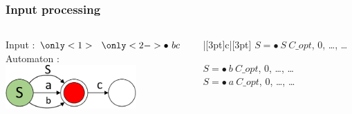 \documentclass{beamer}
\newcounter{NoTableEntry}
\renewcommand*{\theNoTableEntry}{NTE-\the\value{NoTableEntry}}
\newcommand*{\strike}[2]{%
	\multicolumn{1}{#1}{%
		\stepcounter{NoTableEntry}%
		\vadjust pre{\zsavepos{\theNoTableEntry t}}%
		\vadjust{\zsavepos{\theNoTableEntry b}}%
		\zsavepos{\theNoTableEntry l}%
		\hspace{0pt plus 1filll}%
		#2%
		\hspace{0pt plus 1filll}%
		\zsavepos{\theNoTableEntry r}%
		\tikz[overlay]{%
			\draw
			let
			\n{llx}={\zposx{\theNoTableEntry l}sp-\zposx{\theNoTableEntry r}sp-\tabcolsep},
			\n{urx}={\tabcolsep},
			\n{lly}={\zposy{\theNoTableEntry b}sp-\zposy{\theNoTableEntry r}sp},
			\n{ury}={\zposy{\theNoTableEntry t}sp-\zposy{\theNoTableEntry r}sp}
			in
			(\n{llx}, \n{lly}) -- (\n{urx}, \n{ury})
			;
		}%
	}%
}
\begin{document}
	\begin{frame} 
		\frametitle{Input processing}
		\begin{columns}
			\begin{column}{5cm}
				Input : $\only<1>{\ \ }\only<2->{\bullet} \ b c $ \\
				\vspace{15pt}
				Automaton : \\
				\vspace{5pt}
				\includegraphics[width=5cm]{pictures/G2.pdf}
			\end{column}
			\begin{column}{5cm}
				\begin{tabu}{|[3pt]c|[3pt]}
					$S =\bullet \ S\ C\_opt$, 0, \dots, \dots \\
					\hline
					
					$S =\bullet \ b\ C\_opt$, 0, \dots, \dots \\
					\hline
					$S =\bullet \ a\ C\_opt$, 0, \dots, \dots
				\end{tabu}
			\end{column}
		\end{columns}

	\end{frame}
	
\end{document}
